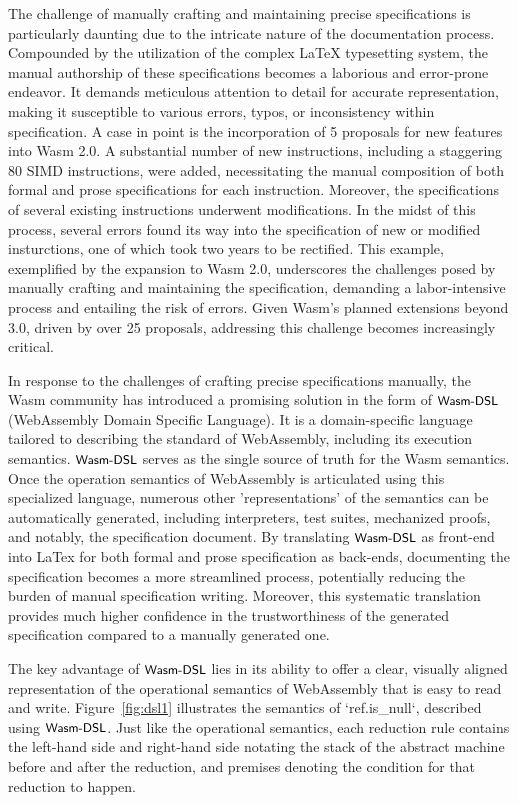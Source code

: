 The challenge of manually crafting and maintaining precise specifications is
particularly daunting due to the intricate nature of the documentation process.
Compounded by the utilization of the complex LaTeX typesetting system, the
manual authorship of these specifications becomes a laborious and error-prone
endeavor. It demands meticulous attention to detail for accurate
representation, making it susceptible to various errors, typos, or
inconsistency within specification. A case in point is the incorporation of 5
proposals for new features into Wasm 2.0. A substantial number of new
instructions, including a staggering 80 SIMD instructions, were added,
necessitating the manual composition of both formal and prose specifications
for each instruction. Moreover, the specifications of several existing
instructions underwent modifications. In the midst of this process, several
errors found its way into the specification of new or modified insturctions,
one of which took two years to be rectified. This example, exemplified by the
expansion to Wasm 2.0, underscores the challenges posed by manually crafting and
maintaining the specification, demanding a labor-intensive process and
entailing the risk of errors. Given Wasm's planned extensions beyond 3.0,
driven by over 25 proposals, addressing this challenge becomes increasingly
critical.

In response to the challenges of crafting precise specifications manually, the
Wasm community has introduced a promising solution in the form of $\textsf{\small Wasm-DSL}$
(WebAssembly Domain Specific Language). It is a domain-specific language
tailored to describing the standard of WebAssembly, including its execution
semantics. $\textsf{\small Wasm-DSL}$ serves as the single source of truth for the Wasm semantics.
Once the operation semantics of WebAssembly is articulated using this
specialized language, numerous other 'representations' of the semantics can be
automatically generated, including interpreters, test suites, mechanized
proofs, and notably, the specification document.  By translating $\textsf{\small Wasm-DSL}$ as
front-end into LaTex for both formal and prose specification as back-ends,
documenting the specification becomes a more streamlined process, potentially
reducing the burden of manual specification writing.  Moreover, this systematic
translation provides much higher confidence in the trustworthiness of the
generated specification compared to a manually generated one.

The key advantage of $\textsf{\small Wasm-DSL}$ lies in its ability to offer a clear, visually
aligned representation of the operational semantics of WebAssembly that is easy
to read and write. Figure~\ref{fig:dsl1} illustrates the semantics of
`ref.is\_null`, described using $\textsf{\small Wasm-DSL}$. Just like the operational semantics,
each reduction rule contains the left-hand side and right-hand side notating
the stack of the abstract machine before and after the reduction, and premises
denoting the condition for that reduction to happen.

